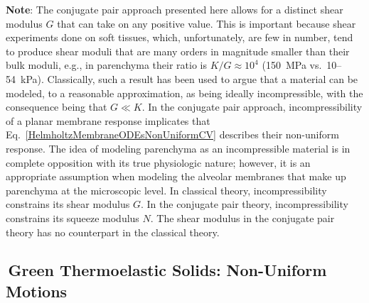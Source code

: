 \medskip\noindent
\textbf{Note}: 
The conjugate pair approach presented here allows for a distinct shear modulus $G$ that can take on any positive value.  This is important because shear experiments done on soft tissues, which, unfortunately, are few in number, tend to produce shear moduli that are many orders in magnitude smaller than their bulk moduli, e.g., in parenchyma their ratio is $K/G \approx 10^{4}$ (150~MPa vs.\ 10--54~kPa).  \cite{Sarafetal07}  Classically, such a result has been used to argue that a material can be modeled, to a reasonable approximation, as being ideally incompressible, with the consequence being that $G \ll K$.  In the conjugate pair approach, incompressibility of a planar membrane response implicates that Eq.~\ref{HelmholtzMembraneODEsNonUniformCV} describes their non-uniform response.  The idea of modeling parenchyma as an incompressible material is in complete opposition with its true physiologic nature; however, it is an appropriate assumption when modeling the alveolar membranes that make up parenchyma at the micro\-scopic level.  In classical theory, incompressibility constrains its shear modulus $G$.  In the conjugate pair theory, incompressibility constrains its squeeze modulus $N$. \cite{Freedetal17,Freed17,FreedZamani19,Freedetal19,ClaytonFreed19,ClaytonFreed20,Freedetal20}  The shear modulus in the conjugate pair theory has no counterpart in the classical theory.

\subsection{$\,$Green Thermoelastic Solids: Non-Uniform Motions}
\label{secNonuniform3D}

